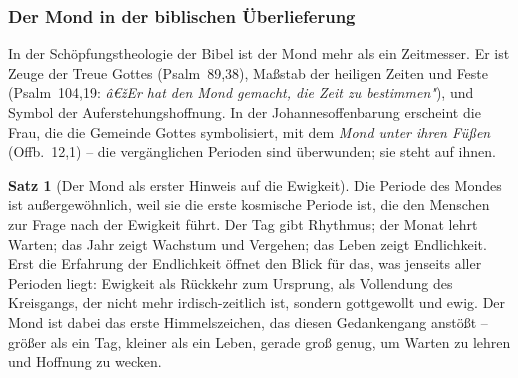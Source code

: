 ﻿\documentclass[a4paper,12pt]{article}
\theoremstyle{definition}
\newtheorem{theorem}{Satz}[section]
\begin{document}
\subsubsection{Der Mond in der biblischen Überlieferung}

In der Schöpfungstheologie der Bibel ist der Mond mehr als ein Zeitmesser. Er ist
Zeuge der Treue Gottes (Psalm~89,38), Maßstab der heiligen Zeiten und Feste
(Psalm~104,19: \textit{â€žEr hat den Mond gemacht, die Zeit zu bestimmen"}), und
Symbol der Auferstehungshoffnung. In der Johannesoffenbarung erscheint die Frau,
die die Gemeinde Gottes symbolisiert, mit dem \textit{Mond unter ihren Füßen}
(Offb.~12,1) -- die vergänglichen Perioden sind überwunden; sie steht auf ihnen.

\begin{theorem}[Der Mond als erster Hinweis auf die Ewigkeit]
	Die Periode des Mondes ist außergewöhnlich, weil sie die erste kosmische
	Periode ist, die den Menschen zur Frage nach der Ewigkeit führt. Der Tag gibt
	Rhythmus; der Monat lehrt Warten; das Jahr zeigt Wachstum und Vergehen; das
	Leben zeigt Endlichkeit. Erst die Erfahrung der Endlichkeit öffnet den Blick
	für das, was jenseits aller Perioden liegt: Ewigkeit als Rückkehr zum Ursprung,
	als Vollendung des Kreisgangs, der nicht mehr irdisch-zeitlich ist, sondern
	gottgewollt und ewig. Der Mond ist dabei das erste Himmelszeichen, das diesen
	Gedankengang anstößt -- größer als ein Tag, kleiner als ein Leben, gerade groß
	genug, um Warten zu lehren und Hoffnung zu wecken.
\end{theorem}
\end{document}
